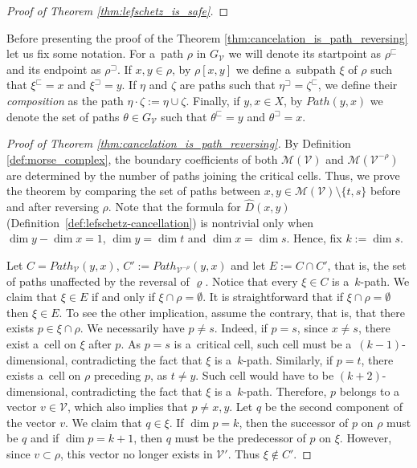 \documentclass[a4paper,12pt, USenglish,cleveref,autoref,thm-restate]{article}
\newcommand{\mB}{D}
\newcommand{\pbeg}[1]{#1^\sqsubset}
\newcommand{\pend}[1]{#1^\sqsupset}
\newcommand{\cV}{\mathcal{V}}
\newcommand{\cM}{\mathcal{M}}
\newcommand{\pathhs}{Path}
\begin{document}
\begin{appendices}
\begin{proof}[Proof of Theorem \ref{thm:lefschetz_is_safe}]
\end{proof}



\InversingPathMorseComplex*

\noindent Before presenting the proof of the Theorem \ref{thm:cancelation_is_path_reversing} let us fix some notation. For a~path $\rho$ in $G_\cV$ we will denote its startpoint as $\pbeg{\rho}$ and its endpoint as $\pend{\rho}$. 
If $x, y \in \rho$, by $\rho[x, y]$ we define a~subpath $\xi$ of $\rho$ such that $\pbeg\xi = x$ and $\pend\xi = y$. 
If $\eta$ and $\zeta$ are paths such that $\pend\eta = \pbeg\zeta$, we define their \emph{composition} as the path $\eta \cdot \zeta := \eta \cup \zeta$. 
Finally, if $y, x \in X$, by $\pathhs(y, x)$ we denote the set of paths $\theta \in G_{\cV}$ such that $\pbeg\theta = y$ and $\pend\theta = x$. 

\begin{proof}[Proof of Theorem \ref{thm:cancelation_is_path_reversing}]
    By Definition \ref{def:morse_complex}, the boundary coefficients of both $\cM(\cV)$ and $\cM(\cV^{-\rho})$ are determined by the number of paths joining the critical cells. 
    Thus, we prove the theorem by comparing the set of paths between $x, y \in \cM(\cV) \setminus \{t, s\}$ before and after reversing $\rho$.
    Note that the formula for $\hat{\mB}(x,y)$ (Definition~\ref{def:lefschetz-cancellation}) is nontrivial only when $\dim y - \dim x=1$, $\dim y=\dim t$ and $\dim x =\dim s$. 
    Hence, fix $k := \dim s$.

    \noindent Let $C=\pathhs_{\cV}(y, x)$, $C':=\pathhs_{\cV^{-\rho}}(y, x)$ and let $E:=C\cap C'$, that is, the set of paths unaffected by the reversal of $\varrho$. 
    Notice that every $\xi \in C$ is a~$k$-path.
    We claim that $\xi \in E$ if and only if $\xi \cap \rho = \emptyset$.
    It is straightforward that if $\xi \cap \rho = \emptyset$ then $\xi\in E$.
    To see the other implication, assume the contrary, that is, that there exists $p \in \xi \cap \rho$.
    We necessarily have $p \neq s$. Indeed, if $p = s$, since $x \neq s$, there exist a~cell on $\xi$ after $p$. As $p = s$ is a~critical cell, such cell must be a~$(k-1)$-dimensional, contradicting the fact that $\xi$ is a~$k$-path. Similarly, if $p = t$, there exists a~cell on $\rho$ preceding $p$, as $t \neq y$. Such cell would have to be $(k+2)$-dimensional, contradicting the fact that $\xi$ is a~$k$-path. 
    Therefore, $p$ belongs to a vector $v \in \cV$, which also implies that $p \neq x, y$. Let $q$ be the second component of the vector $v$. We claim that $q \in \xi$. 
    If $\dim p = k$, then the successor of $p$ on $\rho$ must be $q$ and if $\dim p = k+1$, then $q$ must be the predecessor of $p$ on $\xi$. 
    However, since $v \subset \rho$, this vector no longer exists in $\cV'$. Thus $\xi \not\in C'$. 


\end{proof}
\end{appendices}
\end{document}
